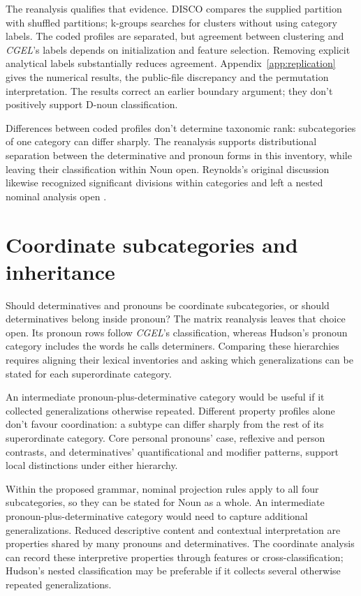 \documentclass[12pt]{article}
\begin{document}
The reanalysis qualifies that evidence. DISCO compares the supplied partition with shuffled partitions; k-groups searches for clusters without using category labels. The coded profiles are separated, but agreement between clustering and \textit{CGEL}'s labels depends on initialization and feature selection. Removing explicit analytical labels substantially reduces agreement. Appendix~\ref{app:replication} gives the numerical results, the public-file discrepancy and the permutation interpretation. The results correct an earlier boundary argument; they don't positively support D-noun classification.

Differences between coded profiles don't determine taxonomic rank: subcategories of one category can differ sharply. The reanalysis supports distributional separation between the determinative and pronoun forms in this inventory, while leaving their classification within Noun open. Reynolds's original discussion likewise recognized significant divisions within categories and left a nested nominal analysis open \citep{reynolds2021}.

\section{Coordinate subcategories and inheritance}\label{sec:inheritance}

Should determinatives and pronouns be coordinate subcategories, or should determinatives belong inside pronoun? The matrix reanalysis leaves that choice open. Its pronoun rows follow \textit{CGEL}'s classification, whereas Hudson's pronoun category includes the words he calls determiners. Comparing these hierarchies requires aligning their lexical inventories and asking which generalizations can be stated for each superordinate category.

An intermediate pronoun-plus-determinative category would be useful if it collected generalizations otherwise repeated. Different property profiles alone don't favour coordination: a subtype can differ sharply from the rest of its superordinate category. Core personal pronouns' case, reflexive and person contrasts, and determinatives' quantificational and modifier patterns, support local distinctions under either hierarchy.

Within the proposed grammar, nominal projection rules apply to all four subcategories, so they can be stated for Noun as a whole. An intermediate pronoun-plus-determinative category would need to capture additional generalizations. Reduced descriptive content and contextual interpretation are properties shared by many pronouns and determinatives. The coordinate analysis can record these interpretive properties through features or cross-classification; Hudson's nested classification may be preferable if it collects several otherwise repeated generalizations.
\end{document}
